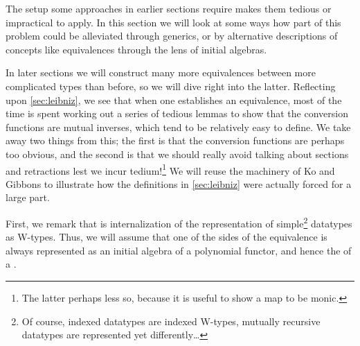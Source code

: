 The setup some approaches in earlier sections require makes them tedious or impractical to apply. In this section we will look at some ways how part of this problem could be alleviated through generics, or by alternative descriptions of concepts like equivalences through the lens of initial algebras. 

In later sections we will construct many more equivalences between more complicated types than before, so we will dive right into the latter. Reflecting upon \autoref{sec:leibniz}, we see that when one establishes an equivalence, most of the time is spent working out a series of tedious lemmas to show that the conversion functions are mutual inverses, which tend to be relatively easy to define. We take away two things from this; the first is that the conversion functions are perhaps too obvious, and the second is that we should really avoid talking about sections and retractions lest we incur tedium!\footnote{The latter perhaps less so, because it is useful to show a map to be monic.} We will reuse the machinery of Ko and Gibbons \cite{progorn} to illustrate how the definitions in \autoref{sec:leibniz} were actually forced for a large part.

First, we remark that  is internalization of the representation of simple\footnote{Of course, indexed datatypes are indexed W-types, mutually recursive datatypes are represented yet differently\dots} datatypes as W-types. Thus, we will assume that one of the sides of the equivalence is always represented as an initial algebra of a polynomial functor, and hence the  of a .

